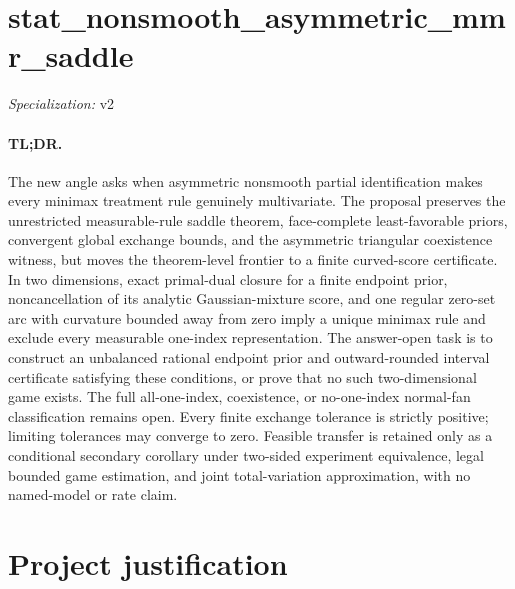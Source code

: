 \documentclass{article}
\begin{document}
\sloppy

\section*{stat\_\allowbreak{}nonsmooth\_\allowbreak{}asymmetric\_\allowbreak{}mmr\_\allowbreak{}saddle}

\noindent\textit{Specialization:} v2\par

\paragraph{TL;DR.} The new angle asks when asymmetric nonsmooth partial identification makes every minimax treatment rule genuinely multivariate. The proposal preserves the unrestricted measurable-rule saddle theorem, face-complete least-favorable priors, convergent global exchange bounds, and the asymmetric triangular coexistence witness, but moves the theorem-level frontier to a finite curved-score certificate. In two dimensions, exact primal-dual closure for a finite endpoint prior, noncancellation of its analytic Gaussian-mixture score, and one regular zero-set arc with curvature bounded away from zero imply a unique minimax rule and exclude every measurable one-index representation. The answer-open task is to construct an unbalanced rational endpoint prior and outward-rounded interval certificate satisfying these conditions, or prove that no such two-dimensional game exists. The full all-one-index, coexistence, or no-one-index normal-fan classification remains open. Every finite exchange tolerance is strictly positive; limiting tolerances may converge to zero. Feasible transfer is retained only as a conditional secondary corollary under two-sided experiment equivalence, legal bounded game estimation, and joint total-variation approximation, with no named-model or rate claim.

\section{Project justification}
\end{document}
